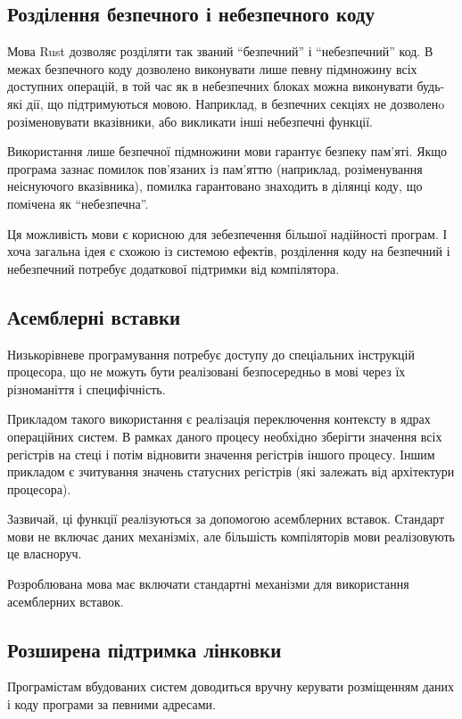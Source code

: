 \documentclass[main.tex]{subfiles}
\begin{document}
\subsection{Розділення безпечного і небезпечного коду}
Мова Rust дозволяє розділяти так званий ``безпечний'' і ``небезпечний'' код.
В межах безпечного коду дозволено виконувати лише певну підмножину всіх доступних операцій, в той час як в небезпечних блоках можна виконувати будь-які дії, що підтримуються мовою.
Наприклад, в безпечних секціях не дозволенo розіменовувати вказівники, або викликати інші небезпечні функції.

Використання лише безпечної підмножини мови гарантує безпеку пам'яті. Якщо програма зазнає помилок пов'язаних із пам'яттю (наприклад, розіменування неіснуючого вказівника), помилка гарантовано знаходить в ділянці коду, що помічена як ``небезпечна''.

Ця можливість мови є корисною для зебезпечення більшої надійності програм. І хоча загальна ідея є схожою із системою ефектів, розділення коду на безпечний і небезпечний потребує додаткової підтримки від компілятора.

\subsection{Асемблерні вставки}
Низькорівневе програмування потребує доступу до спеціальних інструкцій процесора, що не можуть бути реалізовані безпосередньо в мові через їх різноманіття і специфічність.

Прикладом такого використання є реалізація переключення контексту в ядрах операційних систем. В рамках даного процесу необхідно зберігти значення всіх регістрів на стеці і потім відновити значення регістрів іншого процесу.
Іншим прикладом є зчитування значень статусних регістрів (які залежать від архітектури процесора).

Зазвичай, ці функції реалізуються за допомогою асемблерних вставок. Стандарт мови \LangC{} не включає даних механізміх, але більшість компіляторів мови \LangC{} реалізовують це власноруч.

Розроблювана мова має включати стандартні механізми для використання асемблерних вставок.

\subsection{Розширена підтримка лінковки}
Програмістам вбудованих систем доводиться вручну керувати розміщенням даних і коду програми за певними адресами.
\end{document}
